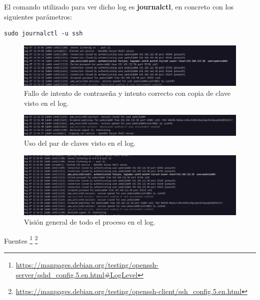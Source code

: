 El comando utilizado para ver dicho log es \textbf{journalctl}, en concreto con los siguientes parámetros:

\begin{lstlisting}[style=mybash]
sudo journalctl -u ssh
\end{lstlisting}

\begin{figure}[H]
	\centering
	\includegraphics[scale=0.40]{10}
	\caption{Fallo de intento de contraseña y intento correcto con copia de clave visto en el log.}
\end{figure}

\begin{figure}[H]
	\centering
	\includegraphics[scale=0.40]{11}
	\caption{Uso del par de claves visto en el log.}
\end{figure}

\begin{figure}[H]
	\centering
	\includegraphics[scale=0.40]{12}
	\caption{Visión general de todo el proceso en el log.}
\end{figure}


Fuentes \footnote{\url{https://manpages.debian.org/testing/openssh-server/sshd\_config.5.en.html\#LogLevel}} \footnote{\url{https://manpages.debian.org/testing/openssh-client/ssh\_config.5.en.html}}






